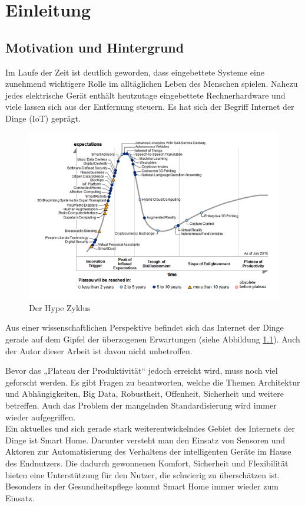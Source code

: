 \chapter{Einleitung}
\section{Motivation und Hintergrund}
Im Laufe der Zeit ist deutlich geworden, dass eingebettete Systeme eine zunehmend wichtigere Rolle im alltäglichen Leben des Menschen spielen. Nahezu jedes elektrische Gerät enthält heutzutage eingebettete Rechnerhardware und viele lassen sich aus der Entfernung steuern. Es hat sich der Begriff Internet der Dinge (IoT) geprägt.

\begin{figure}[h]
	\centering
	\includegraphics{bilder/hype}
	\caption{Der Hype Zyklus \cite{hype}}
	\label{fig:hype}
\end{figure}

Aus einer wissenschaftlichen Perspektive befindet sich das Internet der Dinge gerade auf dem Gipfel der überzogenen Erwartungen (siehe Abbildung \ref{fig:hype}). Auch der Autor dieser Arbeit ist davon nicht un­be­trof­fen.

Bevor das „Plateau der Produktivität“ jedoch erreicht wird, muss noch viel geforscht werden. Es gibt Fragen zu beantworten, welche die Themen Architektur und Abhängigkeiten, Big Data, Robustheit, Offenheit, Sicherheit und weitere betreffen. Auch das Problem der mangelnden Standardisierung wird immer wieder aufgegriffen.\\

Ein aktuelles und sich gerade stark weiterentwickelndes Gebiet des Internets der Dinge ist Smart Home. Darunter versteht man den Einsatz von Sensoren und Aktoren zur Automatisierung des Verhaltens der intelligenten Geräte im Hause des Endnutzers. Die dadurch gewonnenen Komfort, Sicherheit und Flexibilität bieten eine Unterstützung für den Nutzer, die schwierig zu überschätzen ist. Besonders in der Gesundheitspflege kommt Smart Home immer wieder zum Einsatz.\\

